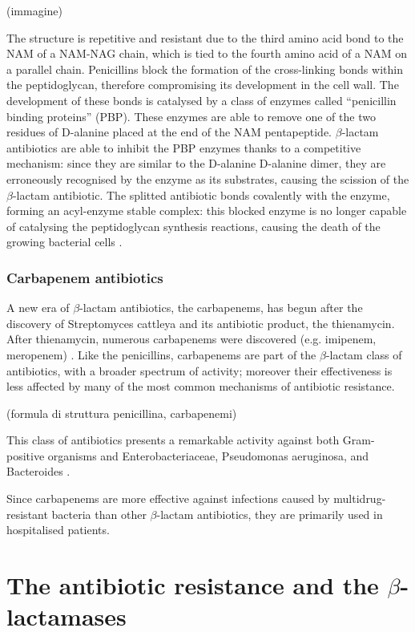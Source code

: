 \documentclass[11pt]{report}
\begin{document}
(immagine)

The structure is repetitive and resistant due to the third amino acid bond to the NAM of a NAM-NAG chain, which is tied to the fourth amino acid of a NAM on a parallel chain.
Penicillins block the formation of the cross-linking bonds within the peptidoglycan, therefore compromising its development in the cell wall.
The development of these bonds is catalysed by a class of enzymes called “penicillin binding proteins” (PBP).
These enzymes are able to remove one of the two residues of D-alanine placed at the end of the NAM pentapeptide.
$\beta$-lactam antibiotics are able to inhibit the PBP enzymes thanks to a competitive mechanism: since they are similar to the D-alanine D-alanine dimer, they are erroneously recognised by the enzyme as its substrates, causing the scission of the $\beta$-lactam antibiotic.
The splitted antibiotic bonds covalently with the enzyme, forming an acyl-enzyme stable complex: this blocked enzyme is no longer capable of catalysing the peptidoglycan synthesis reactions, causing the death of the growing bacterial cells \cite{kong2010beta}.


\subsection{Carbapenem antibiotics}
A new era of $\beta$-lactam antibiotics, the carbapenems, has begun after the discovery of Streptomyces cattleya and its antibiotic product, the thienamycin.
After thienamycin, numerous carbapenems were discovered (e.g. imipenem, meropenem) \cite{Birnbaum1985}.
Like the penicillins, carbapenems are part of the $\beta$-lactam class of antibiotics, with a broader spectrum of activity; moreover their effectiveness is less affected by many of the most common mechanisms of antibiotic resistance.

(formula di struttura penicillina, carbapenemi)

This class of antibiotics presents a remarkable activity against both Gram-positive organisms and Enterobacteriaceae, Pseudomonas aeruginosa, and Bacteroides \cite{Neu1985}.

Since carbapenems are more effective against infections caused by multidrug-resistant bacteria than other $\beta$-lactam antibiotics, they are primarily used in hospitalised patients.

\chapter{The antibiotic resistance and the $\beta$-lactamases}
\end{document}
